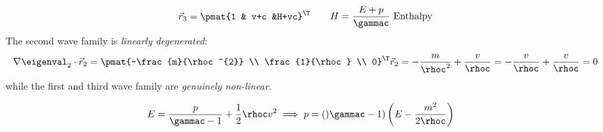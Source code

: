 \begin{examplebox}
\begin{example}
\begin{align*}
\begin{aligned}
            \vec{r}_{3}&=\pmat{1 & v+c &H+vc}^{\T}
            \end{aligned}&&H=\frac{E+p}{\gammac}\text{ Enthalpy}
        \end{align*}
        The second wave family is \textit{linearly degenerated}:
        \begin{align*}
          \nabla\eigenval_{2}\cdot\vec{r}_{2}=
          \pmat{-\frac{m}{\rhoc^{2}} \\ \frac{1}{\rhoc} \\ 0}^{\T}\vec{r}_{2}=-\frac{m}{\rhoc^{2}}+\frac{v}{\rhoc}=-\frac{v}{\rhoc}+\frac{v}{\rhoc}=0
        \end{align*}
        while the first and third wave family are \textit{genuinely non-linear}.
    \end{example}
\end{examplebox}
\begin{notebox}[Note]\nospacing
    \begin{align*}
        &E=\frac{p}{\gammac-1}+\frac{1}{2}\rhoc v^{2}\implies p=()\gammac-1)\left(E-\frac{m^{2}}{2\rhoc}\right)
    \end{align*}
\end{notebox}

